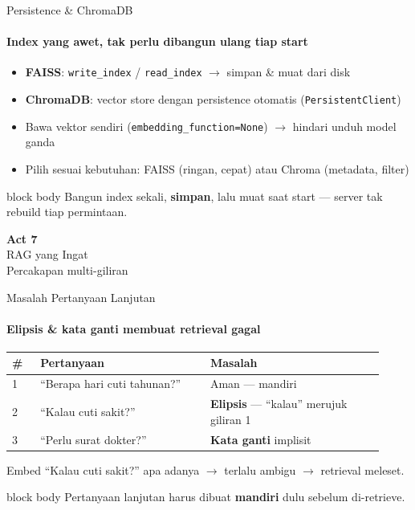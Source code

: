 \documentclass[aspectratio=169,t]{beamer}
\newcommand{\acttitle}[3]{%
  \begin{frame}[plain]
    \vspace{1.5cm}
    \begin{center}
      {\color{nvgreen}\Huge\bfseries Act #1}\\[1.2em]
      {\color{nvwhite}\Huge #2}\\[0.8em]
      {\color{nvgray}\Large #3}
    \end{center}
  \end{frame}%
}
\newcommand{\takeaway}[1]{%
  \vspace{0.3em}
  \begin{beamercolorbox}[rounded=true,shadow=false,sep=6pt]{block body}
    \centering\small\color{nvlightgreen}#1
  \end{beamercolorbox}%
}
\begin{document}
\begin{frame}{Persistence \& ChromaDB}
  \framesubtitle{Index yang awet, tak perlu dibangun ulang tiap start}
  \begin{itemize}\footnotesize
    \item \textbf{FAISS}: \texttt{write\_index} / \texttt{read\_index} $\to$ simpan \& muat dari disk
    \item \textbf{ChromaDB}: vector store dengan persistence otomatis (\texttt{PersistentClient})
    \item Bawa vektor sendiri (\texttt{embedding\_function=None}) $\to$ hindari unduh model ganda
    \item Pilih sesuai kebutuhan: FAISS (ringan, cepat) atau Chroma (metadata, filter)
  \end{itemize}
  \takeaway{Bangun index sekali, \textbf{simpan}, lalu muat saat start --- server tak rebuild tiap permintaan.}
\end{frame}

\acttitle{7}{RAG yang Ingat}{Percakapan multi-giliran}

\begin{frame}{Masalah Pertanyaan Lanjutan}
  \framesubtitle{Elipsis \& kata ganti membuat retrieval gagal}
  \begin{center}
  \renewcommand{\arraystretch}{1.3}{\footnotesize\setlength{\tabcolsep}{5pt}
  \begin{tabular}{@{}p{0.07\linewidth}p{0.42\linewidth}p{0.43\linewidth}@{}}
    \toprule \rowcolor{nvcard!50}
    \textbf{\#} & \textbf{Pertanyaan} & \textbf{Masalah} \\ \midrule
    1 & ``Berapa hari cuti tahunan?'' & Aman --- mandiri \\
    2 & ``Kalau cuti sakit?'' & \textbf{Elipsis} --- ``kalau'' merujuk giliran 1 \\
    3 & ``Perlu surat dokter?'' & \textbf{Kata ganti} implisit \\
    \bottomrule
  \end{tabular}}
  \end{center}
  \vspace{0.2em}
  \begin{center}\textcolor{nvred}{\small Embed ``Kalau cuti sakit?'' apa adanya $\to$ terlalu ambigu $\to$ retrieval meleset.}\end{center}
  \takeaway{Pertanyaan lanjutan harus dibuat \textbf{mandiri} dulu sebelum di-retrieve.}
\end{frame}
\end{document}
